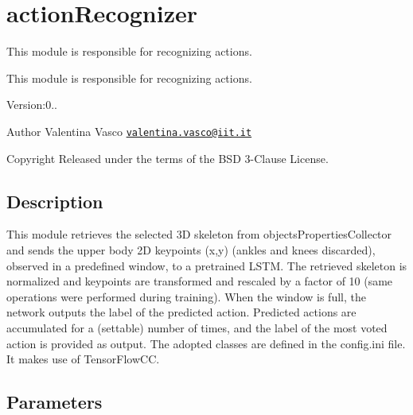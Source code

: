 \section{action\+Recognizer}
\label{group__actionRecognizer}


This module is responsible for recognizing actions.  


This module is responsible for recognizing actions. 

Version\+:0.. \begin{DoxyAuthor}{Author}
Valentina Vasco \href{mailto:valentina.vasco@iit.it}{\tt valentina.\+vasco@iit.\+it} ~\newline
 
\end{DoxyAuthor}
\begin{DoxyCopyright}{Copyright}
Released under the terms of the B\+SD 3-\/\+Clause License. 
\end{DoxyCopyright}
\hypertarget{group__skeletonViewer_intro_sec}{}\subsection{Description}\label{group__skeletonViewer_intro_sec}
This module retrieves the selected 3D skeleton from objects\+Properties\+Collector and sends the upper body 2D keypoints (x,y) (ankles and knees discarded), observed in a predefined window, to a pretrained L\+S\+TM. The retrieved skeleton is normalized and keypoints are transformed and rescaled by a factor of 10 (same operations were performed during training). When the window is full, the network outputs the label of the predicted action. Predicted actions are accumulated for a (settable) number of times, and the label of the most voted action is provided as output. The adopted classes are defined in the config.\+ini file. It makes use of Tensor\+Flow\+CC.\hypertarget{group__skeletonViewer_parameters_sec}{}\subsection{Parameters}\label{group__skeletonViewer_parameters_sec}

